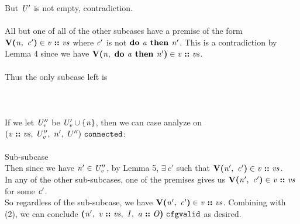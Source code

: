 \documentclass[12pt]{article}
\begin{document}
But $\mathit{U'}$ is not empty, contradiction.\\
\\

All but one of all of the other subcases have a premise of the form
$\textbf{V(}\mathit{n},\ \mathit{c'}\textbf{)} \in \mathit{v}\ \textbf{::}\ \mathit{vs}$ where
$\mathit{c'}$ is not $\textbf{do }\mathit{a}\textbf{ then }\mathit{n'}$. This is a contradiction by
Lemma 4 since we have $\textbf{V(}\mathit{n},\ \textbf{do }\mathit{a}\textbf{ then }\mathit{n'}\textbf{)} \in
\mathit{v}\ \textbf{::}\ \mathit{vs}$.\\
\\

Thus the only subcase left is\\
\\
\\
\\

If we let $\mathit{U_v''}$ be $\mathit{U_v' \cup \{n\}}$, then we can
case analyze on $(\mathit{v}\ \textbf{::}\ \mathit{vs},\ U_v'',\ n',\ U'')\ \mathtt{connected}$:\\
\\

Sub-subcase
\\

Then since we have $\mathit{n'} \in \mathit{U_v''}$, by Lemma 5, $\exists\ c'$
such that $\textbf{V(}\mathit{n'},\ \mathit{c'}\textbf{)} \in \mathit{v}\ \textbf{::}\ \mathit{vs}$.\\

In any of the other sub-subcases, one of the premises gives us
$\textbf{V(}\mathit{n'},\ \mathit{c'}\textbf{)} \in \mathit{v}\ \textbf{::}\ \mathit{vs}$ for some
$\mathit{c'}$.
\\

So regardless of the sub-subcase, we have $\textbf{V(}\mathit{n'},\ \mathit{c'}\textbf{)} \in
\mathit{v}\ \textbf{::}\ \mathit{vs}$. Combining with (2), we can conclude
$\textbf{(}\mathit{n'},\ \mathit{v}\ \textbf{::}\ \mathit{vs},\ \mathit{I},\ \mathit{a}\ \textbf{::}\ \mathit{O}\textbf{)}\ \mathtt{cfgvalid}$
as desired.\\
\\
\end{document}
